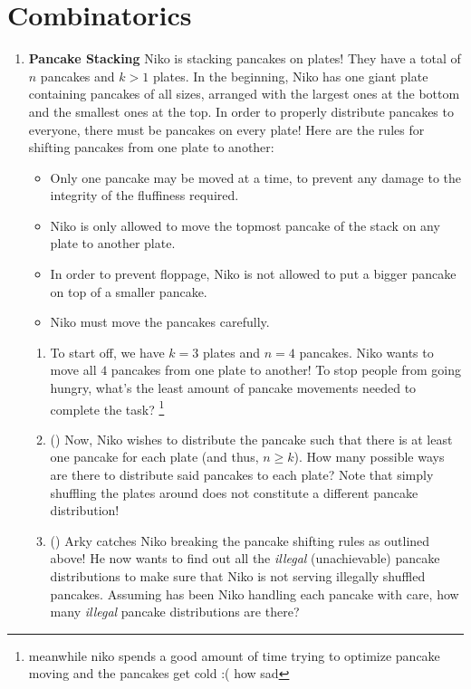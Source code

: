 \documentclass[11pt]{scrartcl}
\begin{document}
\section{Combinatorics}
\begin{enumerate}[label=\textbf{C\arabic*}.]
    \item \textbf{Pancake Stacking} \newline
    Niko is stacking pancakes on plates! They have a total of $n$ pancakes and $k > 1$ plates. In the beginning, Niko has one giant plate containing pancakes of all sizes, arranged with the largest ones at the bottom and the smallest ones at the top. In order to properly distribute pancakes to everyone, there must be pancakes on every plate! Here are the rules for shifting pancakes from one plate to another:
    \begin{itemize}
        \item Only one pancake may be moved at a time, to prevent any damage to the integrity of the fluffiness required.
        \item Niko is only allowed to move the topmost pancake of the stack on any plate to another plate. 
        \item In order to prevent floppage, Niko is not allowed to put a bigger pancake on top of a smaller pancake.
        \item Niko must move the pancakes carefully.
    \end{itemize}
    \begin{enumerate}
        \item To start off, we have $k = 3$ plates and $n = 4$ pancakes. Niko wants to move all $4$ pancakes from one plate to another! To stop people from going hungry, what's the least amount of pancake movements needed to complete the task? \footnote{meanwhile niko spends a good amount of time trying to optimize pancake moving and the pancakes get cold :( how sad}
        \item (\halfchili) Now, Niko wishes to distribute the pancake such that there is at least one pancake for each plate (and thus, $n \geq k$). How many possible ways are there to distribute said pancakes to each plate? Note that simply shuffling the plates around does not constitute a different pancake distribution!
        \item (\halfchili) Arky catches Niko breaking the pancake shifting rules as outlined above! He now wants to find out all the \textit{illegal} (unachievable) pancake distributions to make sure that Niko is not serving illegally shuffled pancakes. Assuming has been Niko handling each pancake with care, how many \textit{illegal} pancake distributions are there?
    \end{enumerate}
    
\end{enumerate}
\end{document}
